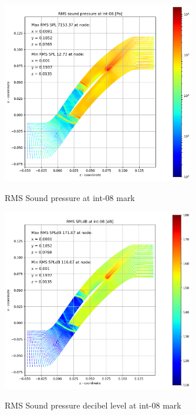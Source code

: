 \begin{figure}[ht]
  \centering
  \includegraphics[width=0.75\textwidth]{Figures/int-08-rms-spl.png} \label{int-08-rms-spl}
  \caption{RMS Sound pressure at int-08 mark}
  
  \vspace*{\floatsep}%

  \includegraphics[width=0.75\textwidth]{Figures/int-08-rms-spldb.png} \label{int-08-rms-spldb}
  \caption{RMS Sound pressure decibel level at int-08 mark}
\end{figure}
